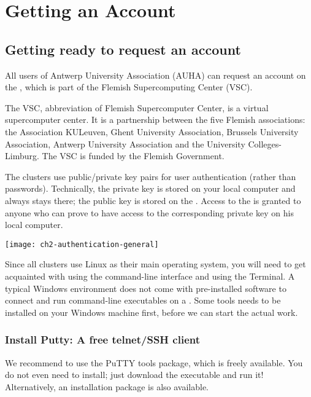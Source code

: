 \chapter{Getting an \hpc Account}
\label{ch:getting-a-hpc-account}

\section{Getting ready to request an account}
\label{sec:getting-ready-to-request-an-account}

All users of Antwerp University Association (AUHA) can request an account on
the \hpc, which is part of the Flemish Supercomputing Center (VSC).

The VSC, abbreviation of Flemish Supercomputer Center, is a virtual
supercomputer center. It is a partnership between the five Flemish
associations: the Association KULeuven,  Ghent University Association, Brussels
University Association, Antwerp University Association and the University
Colleges-Limburg. The VSC is funded by the Flemish Government.

The \hpc clusters use public/private key pairs for user authentication
(rather than passwords). Technically, the private key is stored on your local
computer and always stays there; the public key is stored on the \hpc.
Access to the \hpc is granted to anyone who can prove to have access to the
corresponding private key on his local computer.

\texttt{[image: ch2-authentication-general]}

\ifwindows

  Since all \hpc clusters use Linux as their main operating system, you will
  need to get acquainted with using the command-line interface and using the
  Terminal. A typical Windows environment does not come with pre-installed
  software to connect and run command-line executables on a \hpc. Some tools
  needs to be installed on your Windows machine first, before we can start the
  actual work.

  \subsection{Install Putty: A free telnet/SSH client}
  \label{sec:install-putty}

  We recommend to use the PuTTY tools package, which is freely available. You
  do not even need to install; just download the executable and run it!
  Alternatively, an installation package is also available.

